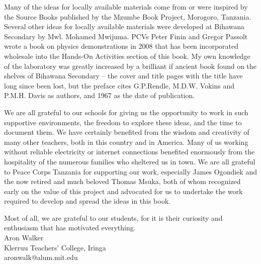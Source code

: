 Many of the ideas for locally available materials 
come from or were inspired by the Source Books 
published by the Mzumbe Book Project, Morogoro, Tanzania. 
Several other ideas for locally available materials 
were developed at Bihawana Secondary by Mwl. Mohamed Mwijuma. 
PCVs Peter Finin and Gregor Passolt wrote 
a book on physics demonstrations in 2008 
that has been incorporated wholesale 
into the Hands-On Activities section of this book. 
My own knowledge of the laboratory was greatly increased 
by a brilliant if ancient book found on the shelves of Bihawana Secondary -- 
the cover and title pages with the title have long since been lost, 
but the preface cites G.P.Rendle, M.D.W. Vokins and P.M.H. Davis as authors, 
and 1967 as the date of publication.

We are all grateful to our schools 
for giving us the opportunity to work in such supportive environments, 
the freedom to explore these ideas, 
and the time to document them. 
We have certainly benefited from the wisdom 
and creativity of many other teachers, 
both in this country and in America. 
Many of us working without reliable electricity 
or internet connections benefited enormously 
from the hospitality of the numerous families 
who sheltered us in town. 
We are all grateful to Peace Corps Tanzania for supporting our work, 
especially James Ogondiek and the now retired and much beloved Thomas Msuka, 
both of whom recognized early on the value of this project 
and advocated for us to undertake the work required to develop 
and spread the ideas in this book.

Most of all, we are grateful to our students, 
for it is their curiosity and enthusiasm that has motivated everything.\\[24pt]
Aron Walker\\
Klerruu Teachers' College, Iringa\\
aronwalk@alum.mit.edu
